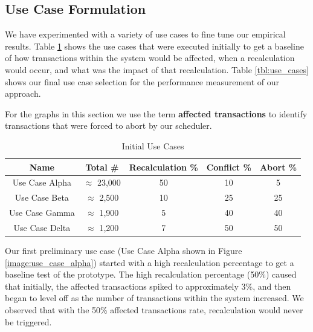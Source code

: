 \subsection{Use Case Formulation}

We have experimented with a variety of use cases to fine tune our empirical results.  Table \ref{tbl:use_cases_initial} shows the use cases that were executed initially to get a baseline of how transactions within the system would be affected, when a recalculation would occur, and what was the impact of that recalculation. Table \ref{tbl:use_cases} shows our final use case selection for the performance measurement of our approach.

For the graphs in this section we use the term \textbf{affected transactions} to identify transactions that were forced to abort by our scheduler.



\begin{table}
\captionsetup{justification=centering}
\centering
 \begin{tabular}{|| c | c | c | c | c ||} 
 \hline
 \textbf{Name} & \textbf{Total \#} & \textbf{Recalculation \%} &  \textbf{Conflict \%} & \textbf{Abort \%} \\ [0.5ex] 
 \hline\hline
 Use Case Alpha & $\approx$ 23,000 & 50 & 10 & 5  \\ 
 \hline
 Use Case Beta & $\approx$ 2,500 & 10 & 25 & 25  \\ 
 \hline
 Use Case Gamma & $\approx$ 1,900 & 5 & 40 & 40  \\ 
 \hline
 Use Case Delta & $\approx$ 1,200 & 7 & 50 & 50  \\ 
 [1ex] 
 \hline
\end{tabular}
\caption{Initial Use Cases}
\label{tbl:use_cases_initial} %
\end{table}

Our first preliminary use case (Use Case Alpha shown in Figure \ref{image:use_case_alpha}) started with a high recalculation percentage to get a baseline test of the prototype. The high recalculation percentage (50\%) caused that initially, the affected transactions spiked to approximately 3\%, and then began to level off as the number of transactions within the system increased. We observed that with the 50\% affected transactions rate, recalculation would never be triggered.

